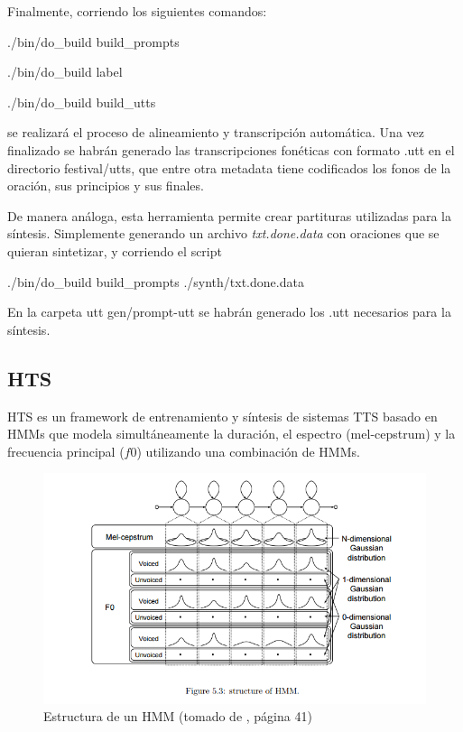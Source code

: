 Finalmente, corriendo los siguientes comandos:

\begin{tcolorbox}
./bin/do\_build build\_prompts

./bin/do\_build label

./bin/do\_build build\_utts
\end{tcolorbox}

\noindent se realizará el proceso de alineamiento y transcripción automática. Una vez finalizado se habrán generado las transcripciones fonéticas con formato .utt en el directorio festival/utts, que entre otra metadata tiene codificados los fonos de la oración, sus principios y sus finales.

De manera análoga, esta herramienta permite crear partituras utilizadas para la síntesis. Simplemente generando un archivo \textit{txt.done.data} con oraciones que se quieran sintetizar, y corriendo el script

\begin{tcolorbox}
./bin/do\_build build\_prompts ./synth/txt.done.data
\end{tcolorbox}

En la carpeta utt gen/prompt-utt se habrán generado los .utt necesarios para la síntesis.


\subsection{HTS}


HTS \cite{hts} es un framework de entrenamiento y síntesis de sistemas TTS basado en HMMs que modela simultáneamente la duración, el espectro (mel-cepstrum) y la frecuencia principal ($f0$) utilizando una combinación de HMMs.

\begin{figure}
\includegraphics[scale=0.5]{imagenes/hmm.png}
\caption{Estructura de un HMM (tomado de \cite{phoneticAndProsodic}, página 41)}
\label{hmmStructure}
\centering
\end{figure}

